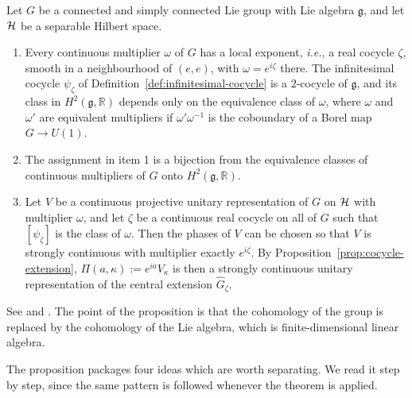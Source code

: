 \begin{proposition}[Bargmann]\label{prop:bargmann-correspondence}
	Let $G$ be a connected and simply connected Lie group with Lie algebra $\mathfrak{g}$, and let $\H$ be a separable Hilbert space.
	\begin{enumerate}
		\item Every continuous multiplier $\omega$ of $G$ has a local exponent, \textit{i.e.}, a real cocycle $\zeta$, smooth in a neighbourhood of $(e,e)$, with $\omega=e^{i\zeta}$ there. The infinitesimal cocycle $\psi_\zeta$ of Definition~\ref{def:infinitesimal-cocycle} is a $2$-cocycle of $\mathfrak{g}$, and its class in $H^2(\mathfrak{g},\mathbb{R})$ depends only on the equivalence class of $\omega$, where $\omega$ and $\omega'$ are equivalent multipliers if $\omega'\omega^{-1}$ is the coboundary of a Borel map $G\to U(1)$.
		\item The assignment in item 1 is a bijection from the equivalence classes of continuous multipliers of $G$ onto $H^2(\mathfrak{g},\mathbb{R})$.
		\item Let $V$ be a continuous projective unitary representation of $G$ on $\H$ with multiplier $\omega$, and let $\zeta$ be a continuous real cocycle on all of $G$ such that $[\psi_\zeta]$ is the class of $\omega$. Then the phases of $V$ can be chosen so that $V$ is strongly continuous with multiplier exactly $e^{i\zeta}$. By Proposition~\ref{prop:cocycle-extension}, $\Pi(a,\kappa):=e^{ia}V_\kappa$ is then a strongly continuous unitary representation of the central extension $\widehat{G}_\zeta$.
	\end{enumerate}
\end{proposition}

\noindent See \cite[TODO-location]{TODO-Bargmann1954} and \cite[TODO-location]{TODO-Varadarajan1985}. The point of the proposition is that the cohomology of the group is replaced by the cohomology of the Lie algebra, which is finite-dimensional linear algebra.

The proposition packages four ideas which are worth separating. We read it step by step, since the same pattern is followed whenever the theorem is applied.

